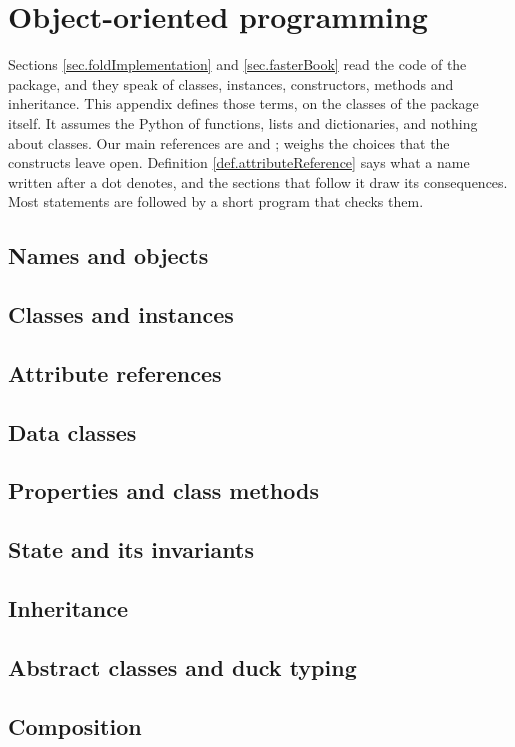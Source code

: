\chapter{Object-oriented programming}
\label{chap.objectOrientedProgramming}

Sections \ref{sec.foldImplementation} and \ref{sec.fasterBook} read the code of the package,
and they speak of classes, instances, constructors, methods and inheritance.
This appendix defines those terms, on the classes of the package itself.
It assumes the Python of functions, lists and dictionaries, and nothing about classes.
Our main references are \cite[Chapter 9]{PSF26tut}
and \cite[Chapters 5, 6 and 11--14]{Ram22flu};
\cite[Chapter 7]{Sla24eff} weighs the choices that the constructs leave open.
Definition \ref{def.attributeReference} says what a name written after a dot denotes,
and the sections that follow it draw its consequences.
Most statements are followed by a short program that checks them.

\section{Names and objects}
\label{sec.namesAndObjects}


\section{Classes and instances}
\label{sec.classesAndInstances}


\section{Attribute references}
\label{sec.attributeReferences}


\section{Data classes}
\label{sec.dataClasses}


\section{Properties and class methods}
\label{sec.propertiesAndClassMethods}


\section{State and its invariants}
\label{sec.stateAndInvariants}


\section{Inheritance}
\label{sec.inheritance}


\section{Abstract classes and duck typing}
\label{sec.abstractClasses}


\section{Composition}
\label{sec.composition}

